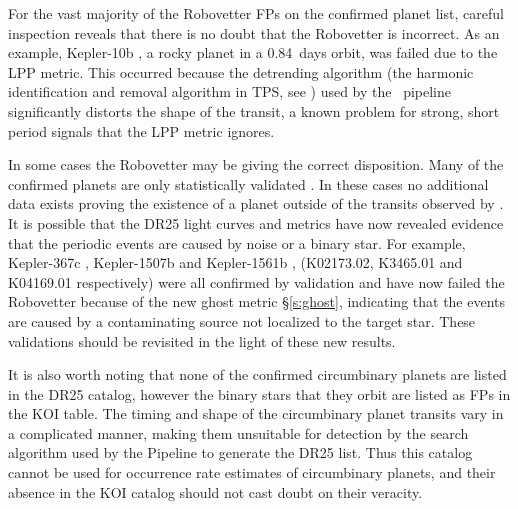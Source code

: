 For the vast majority of the Robovetter FPs on the confirmed planet list, careful inspection reveals that there is no doubt that the Robovetter is incorrect. As an example, Kepler-10b \citep[][]{Batalha2011Kepler10,Fogtmann2014Kepler10}, a rocky planet in a 0.84~days orbit, was failed due to the LPP metric. This occurred because the detrending algorithm (the harmonic identification and removal algorithm in TPS, see \citet{JenkinsKDPH}) used by the \Kepler\ pipeline significantly distorts the shape of the transit, a known problem for strong, short period signals \citep{Christiansen2015} that the LPP metric ignores. 

In some cases the Robovetter may be giving the correct disposition.  Many of the confirmed planets are only statistically validated \citep{Morton2016,Rowe2014}. In these cases no additional data exists proving the existence of a planet outside of the transits observed by \Kepler. It is possible that the DR25 light curves and metrics have now revealed evidence that the periodic events are caused by noise or a binary star. For example, Kepler-367c \citep{Rowe2014}, Kepler-1507b \citep{Morton2016} and Kepler-1561b \citep{Morton2016}, (K02173.02, K3465.01 and K04169.01 respectively) were all confirmed by validation and have now failed the Robovetter because of the new ghost metric \S\ref{s:ghost}, indicating that the events are caused by a contaminating source not localized to the target star.  These validations should be revisited in the light of these new results.

{\color{blue}
It is also worth noting that none of the confirmed circumbinary planets \citep[e.g.,][]{Doyle2011,Orosz2012} are listed in the DR25 catalog, however the binary stars that they orbit are listed as FPs in the KOI table.  The timing and shape of the circumbinary planet transits vary in a complicated manner, making them unsuitable for detection by the search algorithm used by the \Kepler{} Pipeline to generate the DR25 \opstce{} list.  Thus this catalog cannot be used for occurrence rate estimates of circumbinary planets, and their absence in the KOI catalog should not cast doubt on their veracity. 
}


